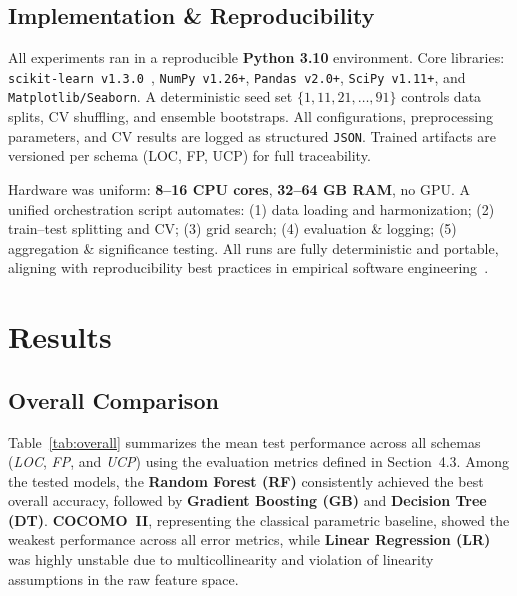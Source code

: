 \documentclass[11pt,a4paper]{article}
\begin{document}
\subsection{Implementation \& Reproducibility}
All experiments ran in a reproducible \textbf{Python 3.10} environment.  
Core libraries:  
\texttt{scikit-learn v1.3.0}~\cite{pedregosa2011scikit},  
\texttt{NumPy v1.26+}, \texttt{Pandas v2.0+},  
\texttt{SciPy v1.11+}, and  
\texttt{Matplotlib/Seaborn}.  
A deterministic seed set $\{1,11,21,\dots,91\}$ controls 
data splits, CV shuffling, and ensemble bootstraps.  
All configurations, preprocessing parameters, and CV results 
are logged as structured \texttt{JSON}.  
Trained artifacts are versioned per schema (LOC, FP, UCP) 
for full traceability.

Hardware was uniform: \textbf{8–16 CPU cores}, \textbf{32–64 GB RAM}, no GPU.  
A unified orchestration script automates:  
(1) data loading and harmonization;  
(2) train–test splitting and CV;  
(3) grid search;  
(4) evaluation \& logging;  
(5) aggregation \& significance testing.  
All runs are fully deterministic and portable, 
aligning with reproducibility best practices in 
empirical software engineering~\cite{cruz2019open,lopez2021empirical}.





\section{Results}

\subsection{Overall Comparison}

Table~\ref{tab:overall} summarizes the mean test performance across all schemas 
(\textit{LOC}, \textit{FP}, and \textit{UCP}) using the evaluation metrics defined in Section~4.3.
Among the tested models, the \textbf{Random Forest (RF)} consistently achieved the best overall accuracy, 
followed by \textbf{Gradient Boosting (GB)} and \textbf{Decision Tree (DT)}. 
\textbf{COCOMO~II}, representing the classical parametric baseline, 
showed the weakest performance across all error metrics, 
while \textbf{Linear Regression (LR)} was highly unstable due to multicollinearity 
and violation of linearity assumptions in the raw feature space.
\end{document}
